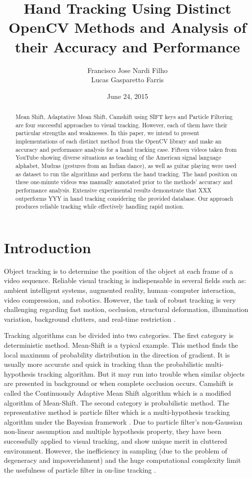 \documentclass[a4paper]{article}
\title{Hand Tracking Using Distinct OpenCV Methods and Analysis of their Accuracy and Performance}
\author{Francisco Jose Nardi Filho\\ Lucas Gasparetto Farris}
\date{June  24, 2015}
\begin{document}
\maketitle

\begin{abstract}
\noindent
Mean Shift, Adaptative Mean Shift, Camshift using SIFT keys and Particle Filtering are four successful approaches to visual tracking. 
However, each of them have their particular strengths and weaknesses. In this paper, we intend to present implementations of each distinct method from the OpenCV library and make an accuracy and  performance analysis for a hand tracking case. Fifteen videos taken from YouTube showing diverse situations as teaching of the American signal language alphabet, Mudras (gestures from an Indian dance), as well as guitar playing  were used as dataset to run the algorithms and perform the hand tracking. The hand position on these one-minute videos was manually annotated prior to the methods' accuracy and performance analysis. Extensive experimental results demonstrate that XXX outperforms YYY in hand tracking considering the provided database. Our approach produces reliable tracking while effectively handling rapid motion.
\end{abstract}

\section{Introduction}

Object tracking is to determine the position of the object at each frame of a video sequence. Reliable visual tracking is indispensable in several fields such as: ambient intelligent systems, augmented reality, human–computer interaction, video compression, and robotics. However, the task of robust tracking is very challenging regarding fast motion, occlusion, structural deformation, illumination variation, background clutters, and real-time restriction \cite{Yin2011}. 
\par
Tracking algorithms can be divided into two categories. The first category is deterministic method. Mean-Shift  is a typical example. This method finds the local maximum of probability distribution in the direction of gradient. It is usually more accurate and quick in tracking than the probabilistic multi-hypothesis tracking algorithm. But it may run into trouble when similar objects are presented in background or when complete occlusion occurs. Camshift is called the Continuously Adaptive Mean Shift algorithm which is a modified algorithm of Mean-Shift. The second category is probabilistic method. The representative method is particle filter which is a multi-hypothesis tracking algorithm under the Bayesian framework . Due to particle filter’s non-Gaussian non-linear assumption and multiple hypothesis property, they have been successfully applied to visual tracking, and show unique merit in cluttered environment. However, the inefficiency in sampling (due to the problem of degeneracy and impoverishment) and the huge computational complexity limit the usefulness of particle filter in on-line tracking \cite{Yin2011}.
\par
\end{document}
